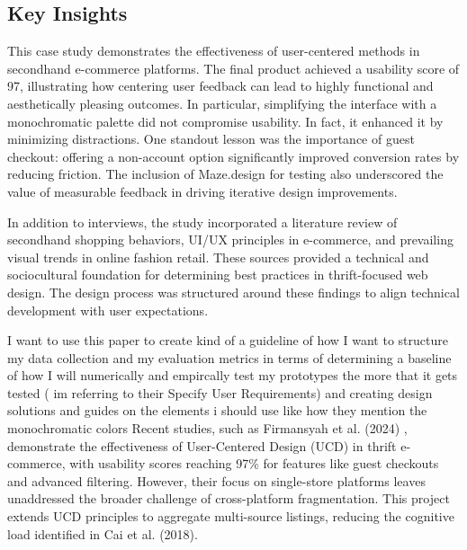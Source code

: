 \documentclass[10pt,twocolumn]{article}
\begin{document}
\subsection{Key Insights}
This case study demonstrates the effectiveness of user-centered methods in secondhand e-commerce platforms. The final product achieved a usability score of 97, illustrating how centering user feedback can lead to highly functional and aesthetically pleasing outcomes. In particular, simplifying the interface with a monochromatic palette did not compromise usability. In fact, it enhanced it by minimizing distractions. One standout lesson was the importance of guest checkout: offering a non-account option significantly improved conversion rates by reducing friction. The inclusion of Maze.design for testing also underscored the value of measurable feedback in driving iterative design improvements.




In addition to interviews, the study incorporated a literature review of secondhand shopping behaviors, UI/UX principles in e-commerce, and prevailing visual trends in online fashion retail. These sources provided a technical and sociocultural foundation for determining best practices in thrift-focused web design. The design process was structured around these findings to align technical development with user expectations.

I want to use this paper to create kind of a guideline of how I want to structure my data collection and my evaluation metrics in terms of determining a baseline of how I will numerically and empircally test my prototypes the more that it gets tested ( im referring to their Specify User Requirements) and creating design solutions and guides on the elements i should use like how they mention the monochromatic colors 
Recent studies, such as Firmansyah et al. (2024) \cite{firmansyah2024}, demonstrate the effectiveness of User-Centered Design (UCD) in thrift e-commerce, with usability scores reaching 97\% for features like guest checkouts and advanced filtering. However, their focus on single-store platforms leaves unaddressed the broader challenge of cross-platform fragmentation. This project extends UCD principles to aggregate multi-source listings, reducing the cognitive load identified in Cai et al. (2018).
\end{document}
